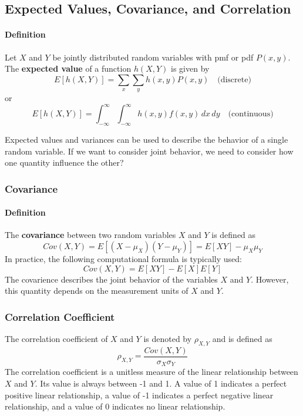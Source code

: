 \subsection{Expected Values, Covariance, and Correlation}

\hrulefill

\paragraph{Definition}
Let $X$ and $Y$ be jointly distributed random variables with pmf or pdf $P(x,y)$. The \textbf{expected value} of a function $h(X,Y)$ is given by
\[
E[h(X,Y)] = \sum_{x} \sum_{y} h(x,y) P(x,y) \quad \text{(discrete)}
\]
or
\[
E[h(X,Y)] = \int_{-\infty}^{\infty} \int_{-\infty}^{\infty} h(x,y) f(x,y) \, dx \, dy \quad \text{(continuous)}
\] 

Expected values and variances can be used to describe the behavior of a single random variable. If we want to consider joint behavior,
we need to consider how one quantity influence the other?

\subsubsection*{Covariance}
\paragraph{Definition}
The \textbf{covariance} between two random variables $X$ and $Y$ is defined as
\[Cov(X,Y) = E[(X - \mu_X)(Y - \mu_Y)] = E[XY] - \mu_X \mu_Y\]
In practice, the following computational formula is typically used:
\[Cov(X,Y) = E[XY] - E[X]E[Y]\]
The covarience describes the joint behavior of the variables $X$ and $Y$. However, this quantity depends
on the measurement units of $X$ and $Y$.

\subsubsection*{Correlation Coefficient}
The correlation coefficient of $X$ and $Y$ is denoted by $\rho_{X,Y}$ and is defined as
\[\rho_{X,Y} = \frac{Cov(X,Y)}{\sigma_X \sigma_Y}\]
The correlation coefficient is a unitless measure of the linear relationship between $X$ and $Y$.
Its value is always between -1 and 1. A value of 1 indicates a perfect positive linear relationship,
a value of -1 indicates a perfect negative linear relationship, and a value of 0 indicates no linear relationship.

